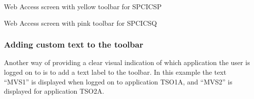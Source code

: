 \documentclass[letterpaper,10pt,english]{sphinxmanual}
\begin{document}
\begin{sphinxVerbatim}[commandchars=\\\{\}]
        
       
 
 
\end{sphinxVerbatim}


Web Access screen with yellow toolbar for SPCICSP

Web Access screen with pink toolbar for SPCICSQ


\subsubsection{Adding custom text to the toolbar}
\label{\detokenize{User_Guide:adding-custom-text-to-the-toolbar}}
Another way of providing a clear visual indication of which application the user is logged on to is to add a text label to
the toolbar. In this example the text “MVS1” is displayed when logged on to application TSO1A, and “MVS2” is
displayed for application TSO2A.
\end{document}
